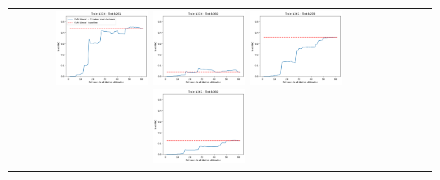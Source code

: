 \begin{figure}[h!]
\begin{tabular}{cccc}
  \includegraphics[width=0.25\textwidth]{Kap6/pearson_linear_INDIVIDUAL_CURVES_train=b234test=b261}  \includegraphics[width=0.25\textwidth]{Kap6/pearson_linear_INDIVIDUAL_CURVES_train=b234test=b360}
  \includegraphics[width=0.25\textwidth]{Kap6/pearson_linear_INDIVIDUAL_CURVES_train=b261test=b278}  \includegraphics[width=0.25\textwidth]{Kap6/pearson_linear_INDIVIDUAL_CURVES_train=b261test=b360} \\


\end{tabular}
\end{figure}
